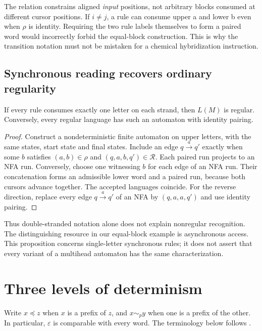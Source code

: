 The relation constrains aligned \emph{input} positions, not arbitrary blocks
consumed at different cursor positions. If $i\ne j$, a rule can consume
upper a and lower b even when $\rho$ is identity. Requiring the two rule
labels themselves to form a paired word would incorrectly forbid the
equal-block construction. This is why the transition notation must not be
mistaken for a chemical hybridization instruction.

\subsection{Synchronous reading recovers ordinary regularity}
\begin{proposition}
If every rule consumes exactly one letter on each strand, then $L(M)$ is
regular. Conversely, every regular language has such an automaton with
identity pairing.
\end{proposition}
\begin{proof}
Construct a nondeterministic finite automaton on upper letters, with the same
states, start state and final states. Include an edge $q\xrightarrow{a}q'$
exactly when some $b$ satisfies $(a,b)\in\rho$ and
$(q,a,b,q')\in\mathcal R$. Each paired run projects to an NFA run.
Conversely, choose one witnessing $b$ for each edge of an NFA run. Their
concatenation forms an admissible lower word and a paired run, because both
cursors advance together. The accepted languages coincide. For the reverse
direction, replace every edge $q\xrightarrow{a}q'$ of an NFA by
$(q,a,a,q')$ and use identity pairing.
\end{proof}
Thus double-stranded notation alone does not explain nonregular recognition.
The distinguishing resource in our equal-block example is asynchronous access.
This proposition concerns single-letter synchronous rules; it does not assert
that every variant of a multihead automaton has the same characterization.

\section{Three levels of determinism}
Write $x\preceq z$ when $x$ is a prefix of $z$, and $x\sim_p y$ when
one is a prefix of the other. In particular, $\varepsilon$ is comparable
with every word. The terminology below follows \cite{czeizler}.

